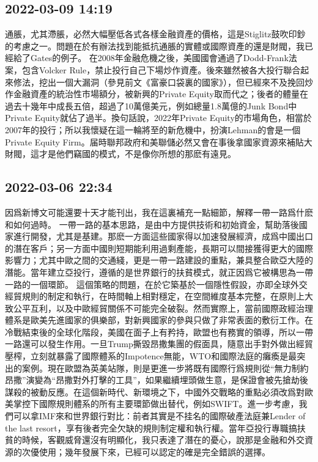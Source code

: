 \documentclass[twocolumn]{ctexart}
\begin{document}
\subsection*{2022-03-09 14:19}

通脹，尤其滯脹，必然大幅壓低各式各樣金融資產的價格，這是Stiglitz鼓吹印鈔的考慮之一。問題在於有辦法找到能抵抗通脹的實體或國際資產的還是財閥，我已經給了Gates的例子。
在2008年金融危機之後，美國國會通過了Dodd-Frank法案，包含Volcker Rule，禁止投行自己下場炒作資產。後來雖然被各大投行聯合起來修法，挖出一個大漏洞（參見前文《富豪口袋裏的國家》），但已經來不及挽回炒作金融資產的統治性市場額分，被新興的Private Equity取而代之；後者的體量在過去十幾年中成長五倍，超過了10萬億美元，例如總量1.8萬億的Junk Bond中Private Equity就佔了過半。換句話說，2022年Private Equity的市場角色，相當於2007年的投行；所以我懷疑在這一輪將至的新危機中，扮演Lehman的會是一個Private Equity Firm。届時聯邦政府和美聯儲必然又會在事後拿國家資源來補貼大財閥，這才是他們竊國的模式，不是像你所想的那麽有遠見。
\subsection*{2022-03-06 22:34}

因爲新博文可能還要十天才能刊出，我在這裏補充一點細節，解釋一帶一路爲什麽和如何過時。
一帶一路的基本思路，是由中方提供技術和初始資金，幫助落後國家進行開發，尤其是基建。那麽一方面這些國家得以加速發展經濟，成爲中國出口的潛在客戶；另一方面中國則短期能利用過剩產能，長期可以間接獲得更大的國際影響力；尤其中歐之間的交通綫，更是一帶一路建設的重點，兼具整合歐亞大陸的潛能。當年建立亞投行，遵循的是世界銀行的扶貧模式，就正因爲它被構思為一帶一路的一個環節。
這個策略的問題，在於它築基於一個隱性假設，亦即全球外交經貿規則的制定和執行，在時間軸上相對穩定，在空間維度基本完整，在原則上大致公平互利，以及中歐經貿關係不可能完全破裂。然而實際上，當前國際政經治理體系是歐美先進國家的俱樂部，對新興國家的參與只做了非常表面的敷衍工作。在冷戰結束後的全球化階段，美國在面子上有矜持，歐盟也有務實的領導，所以一帶一路還可以發生作用。一旦Trump撕毀昂撒集團的假面具，隨意出手對外做出經貿壓榨，立刻就暴露了國際體系的Impotence無能，WTO和國際法庭的癱瘓是最突出的案例。現在歐盟為英美站隊，則是更進一步將既有國際行爲規則從“無力制約昂撒”演變為“昂撒對外打擊的工具”，如果繼續埋頭做生意，是保證會被先搶劫後謀殺的被動反應。在這個新時代、新環境之下，中國外交戰略的重點必須改爲對歐美掌控下國際規則體系的所有主要環節做出替代，例如SWIFT。進一步考慮，我們可以拿IMF來和世界銀行對比：前者其實是不挂名的國際破產法庭兼Lender of the last resort，享有後者完全欠缺的規則制定權和執行權。當年亞投行專職搞扶貧的時候，客觀威脅還沒有明顯化，我只表達了潛在的憂心，說那是金融和外交資源的次優使用；幾年發展下來，已經可以認定的確是完全錯誤的選擇。
\end{document}
